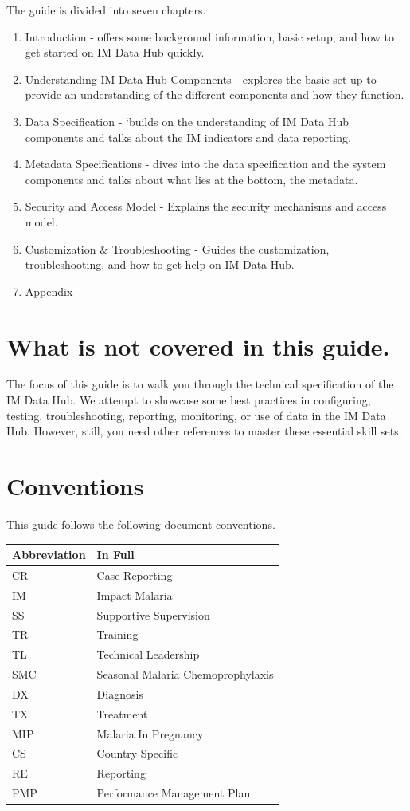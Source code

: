 \documentclass[]{book}
\providecommand{\tightlist}{%
  \setlength{\itemsep}{0pt}\setlength{\parskip}{0pt}}
\begin{document}
The guide is divided into seven chapters.

\begin{enumerate}
\def\labelenumi{\arabic{enumi}.}
\tightlist
\item
  Introduction - offers some background information, basic setup, and how to get started on IM Data Hub quickly.
\item
  Understanding IM Data Hub Components - explores the basic set up to provide an understanding of the different components and how they function.
\item
  Data Specification - `builds on the understanding of IM Data Hub components and talks about the IM indicators and data reporting.
\item
  Metadata Specifications - dives into the data specification and the system components and talks about what lies at the bottom, the metadata.
\item
  Security and Access Model - Explains the security mechanisms and access model.
\item
  Customization \& Troubleshooting - Guides the customization, troubleshooting, and how to get help on IM Data Hub.
\item
  Appendix -
\end{enumerate}

\hypertarget{what-is-not-covered-in-this-guide.}{%
\section{What is not covered in this guide.}\label{what-is-not-covered-in-this-guide.}}

The focus of this guide is to walk you through the technical specification of the IM Data Hub. We attempt to showcase some best practices in configuring, testing, troubleshooting, reporting, monitoring, or use of data in the IM Data Hub. However, still, you need other references to master these essential skill sets.

\hypertarget{conventions}{%
\section{Conventions}\label{conventions}}

This guide follows the following document conventions.

\begin{longtable}[]{@{}ll@{}}
\toprule
Abbreviation & In Full\tabularnewline
\midrule
\endhead
CR & Case Reporting\tabularnewline
IM & Impact Malaria\tabularnewline
SS & Supportive Supervision\tabularnewline
TR & Training\tabularnewline
TL & Technical Leadership\tabularnewline
SMC & Seasonal Malaria Chemoprophylaxis\tabularnewline
DX & Diagnosis\tabularnewline
TX & Treatment\tabularnewline
MIP & Malaria In Pregnancy\tabularnewline
CS & Country Specific\tabularnewline
RE & Reporting\tabularnewline
PMP & Performance Management Plan\tabularnewline
\bottomrule
\end{longtable}
\end{document}
